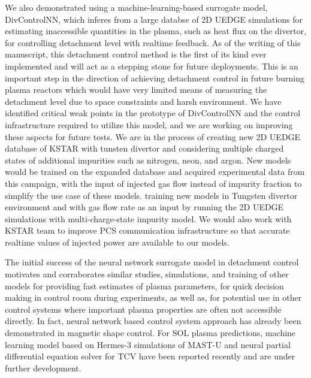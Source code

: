 We also demonstrated using a machine-learning-based surrogate model, DivControlNN, which inferes from a large databse of 2D UEDGE simulations for estimating inaccessible quantities in the plasma, such as heat flux on the divertor, for controlling detachment level with realtime feedback.
As of the writing of this manuscript, this detachment control method is the first of its kind ever implemented and will act as a stepping stone for future deployments.
This is an important step in the direction of achieving detachment control in future burning plasma reactors which would have very limited means of measuring the detachment level due to space constraints and harsh environment.
We have identified critical weak points in the prototype of DivControlNN and the control infrastructure required to utilize this model, and we are working on improving these aspects for future tests.
We are in the process of creating new 2D UEDGE database of KSTAR with tunsten divertor and considering multiple charged states of additional impurities such as nitrogen, neon, and argon.
New models would be trained on the expanded database and acquired experimental data from this campaign, with the input of injected gas flow instead of impurity fraction to simplify the use case of these models.
training new models in Tungsten divertor environment and with gas flow rate as an input by running the 2D UEDGE simulations with multi-charge-state impurity model.
We would also work with KSTAR team to improve PCS communication infrastructure so that accurate realtime values of injected power are available to our models.

The initial success of the neural network surrogate model in detachment control motivates and corraborates similar studies, simulations, and training of other models for providing fast estimates of plasma parameters, for quick decision making in control room during experiments, as well as, for potential use in other control systems where important plasma properties are often not accessible directly.
In fact, neural network based control system approach has already been demonstrated in magnetic shape control\cite{Degrave_2022_Nature}.
For \ac{SOL} plasma predictions, machine learning model based on Hermes-3\cite{Dudson_2024_CPC} simulations of MAST-U\cite{Holt_2024_NF} and neural partial differential equation solver for TCV\cite{Poels_2023_NF} have been reported recently and are under further development.

